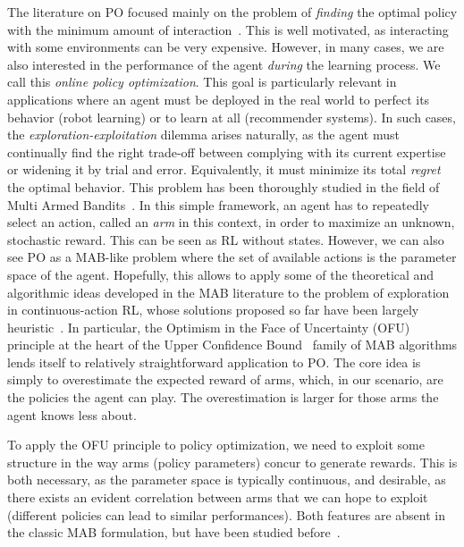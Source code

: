 \documentclass{article}
\begin{document}
The literature on PO focused mainly on the problem of \textit{finding} the optimal policy with the minimum amount of interaction~\cite{sutton2000policy,sehnke2008policy,silver2014deterministic,schulman2015trust,mnih2016asynchronous,espeholt2018impala}. This is well motivated, as interacting with some environments can be very expensive. However, in many cases, we are also interested in the performance of the agent \textit{during} the learning process. We call this \textit{online policy optimization}. This goal is particularly relevant in applications where an agent must be deployed in the real world to perfect its behavior (\eg robot learning) or to learn at all (\eg recommender systems). In such cases, the \textit{exploration-exploitation} dilemma arises naturally, as the agent must continually find the right trade-off between complying with its current expertise or widening it by trial and error. Equivalently, it must minimize its total \textit{regret} \wrt the optimal behavior. This problem has been thoroughly studied in the field of Multi Armed Bandits~\citep[MAB,][]{auer2002finite,lattimore2019bandit}. In this simple framework, an agent has to repeatedly select an action, called an \textit{arm} in this context, in order to maximize an unknown, stochastic reward. This can be seen as RL without states. However, we can also see PO as a MAB-like problem where the set of available actions is the parameter space of the agent. Hopefully, this allows to apply some of the theoretical and algorithmic ideas developed in the MAB literature to the problem of exploration in continuous-action RL, whose solutions proposed so far have been largely heuristic~\citep{houthooft2016vime,haarnoja2017reinforcement,haarnoja2018soft}. In particular, the Optimism in the Face of Uncertainty (OFU) principle at the heart of the Upper Confidence Bound~\citep[UCB,][]{lai1985asymptotically,agrawal1995sample,auer2002using} family of MAB algorithms lends itself to relatively straightforward application to PO. The core idea is simply to overestimate the expected reward of arms, which, in our scenario, are the policies the agent can play. The overestimation is larger for those arms the agent knows less about.

To apply the OFU principle to policy optimization, we need to exploit some structure in the way arms (policy parameters) concur to generate rewards. This is both necessary, as the parameter space is typically continuous, and desirable, as there exists an evident correlation between arms that we can hope to exploit (different policies can lead to similar performances). Both features are absent in the classic MAB formulation, but have been studied before~\citep[\eg][see Section \ref{sec:related} for a brief overview of the related literature, including applications to RL]{pandey2007multi,kleinberg2005nearly}.
\end{document}
